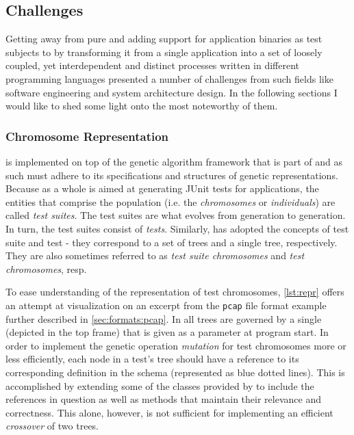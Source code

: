 \subsection{Challenges}
Getting away from pure \java and adding support for application binaries as test subjects 
to \xmlmate by transforming it from 
a single \java application into a set of loosely coupled, yet interdependent and distinct 
processes written in different programming languages presented a number of challenges from 
such fields like software engineering and system architecture design. 
In the following sections I would like to shed some light onto 
the most noteworthy of them.
\subsubsection{Chromosome Representation}
\label{sec:repr}
\xmlmate is implemented on top of the genetic algorithm framework that is part of 
\evosuite{}\cite{fraser2013whole} and as such must adhere to its specifications and structures 
of genetic representations. 
Because \evosuite as a whole is aimed at generating {\small JUnit} tests for \java applications, 
the entities that comprise the population  (i.e. the \emph{chromosomes} or \emph{individuals}) 
are called \emph{test suites}. The test suites are what evolves from generation to generation.
In turn, the test suites consist of \emph{tests}. Similarly, \xmlmate has adopted the concepts of 
test suite and test - they correspond to a set of \xml trees and a single \xml tree, respectively. 
They are also sometimes referred to as \emph{test suite chromosomes} and \emph{test chromosomes}, resp.

To ease understanding of the representation of \xml test chromosomes, \cref{lst:repr} offers an attempt at
visualization on an excerpt from the \texttt{pcap} file format example further described in
\cref{sec:formats:pcap}. In \xmlmate all \xml trees are governed by a single \xsd (depicted in the top frame)
that is given as a parameter at program start. In order to implement the genetic operation \emph{mutation} for
test chromosomes more or less efficiently, each node in a test's \xml tree should have a reference to its
corresponding definition in the schema (represented as blue dotted lines). This is accomplished by extending
some of the \java classes provided by \xom to include the references in question as well as methods that maintain
their relevance and correctness. This alone, however, is not sufficient for implementing an efficient
\emph{crossover} of two \xml trees.

